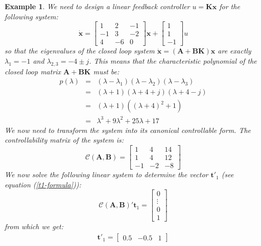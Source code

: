 \documentclass[a4paper,10pt,oneside]{book}
\newtheorem{example}{Example}
\begin{document}
\begin{example}
 We need to design a linear feedback controller $u=\mathbf{Kx}$ for the following system:
\begin{equation}
\dot{ \mathbf{x}}=\left[ {\begin{array}{ccc}
1 & 2 & -1\\
-1& 3 & -2\\
4& -6 & 0
 \end{array} } \right]\mathbf{x}+
\left[ {\begin{array}{c}
1\\
1\\
-1
 \end{array} } \right]u
\end{equation}
so that the eigenvalues of the closed loop system $\dot{ \mathbf{x}}=(\mathbf{A}+\mathbf{BK})\mathbf{x}$ are exactly $\lambda_1=-1$ and $\lambda_{2,3}=-4\pm j$. This means that the characteristic polynomial of the closed loop matrix $\mathbf{A}+\mathbf{BK}$ must be:
\begin{eqnarray}
 p(\lambda)	&=&(\lambda-\lambda_1)(\lambda-\lambda_2)(\lambda-\lambda_3)\\
		&=&(\lambda+1)(\lambda+4+j)(\lambda+4-j)\\
		&=&(\lambda+1)((\lambda+4)^2+1)\\
		&=& \lambda^3 + 9\lambda^2+25\lambda+17
\end{eqnarray}
We now need to transform the system into its canonical controllable form. The controllability matrix of the system is:
\begin{equation}
 \mathcal{C}(\mathbf{A},\mathbf{B})=\left[ {\begin{array}{ccc}
1 & 4 & 14\\
1 & 4 & 12\\
-1& -2 & -8
 \end{array} } \right]
\end{equation}
We now solve the following linear system to determine the vector $\mathbf{t}'_1$ (see equation (\ref{t1-formula})):
\begin{equation}
 \mathcal{C}(\mathbf{A},\mathbf{B})'\mathbf{t}_1=\left[ {\begin{array}{c}0\\\vdots\\0\\1 \end{array} } \right]
\end{equation}
from which we get:
\begin{eqnarray}
 \mathbf{t}'_1=\left[ {\begin{array}{ccc}0.5&-0.5&1\end{array} } \right]\\

\end{eqnarray}
\end{example}
\end{document}

